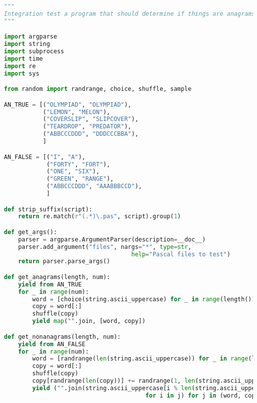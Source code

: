 \documentclass{article}
\begin{document}
\begin{lstlisting}[language=Python, caption=Testing script]
"""
Integration test a program that should determine if things are anagrams
"""

import argparse
import string
import subprocess
import time
import re
import sys

from random import randrange, choice, shuffle, sample

AN_TRUE = [("OLYMPIAD", "OLYMPIAD"),
           ("LEMON", "MELON"),
           ("COVERSLIP", "SLIPCOVER"),
           ("TEARDROP", "PREDATOR"),
           ("ABBCCCDDD", "DDDCCCBBA"),
           ]

AN_FALSE = [("I", "A"),
            ("FORTY", "FORT"),
            ("ONE", "SIX"),
            ("GREEN", "RANGE"),
            ("ABBCCCDDD", "AAABBBCCD"),
            ]

def strip_suffix(script):
    return re.match(r"(.*)\.pas", script).group(1)

def get_args():
    parser = argparse.ArgumentParser(description=__doc__)
    parser.add_argument("files", nargs="*", type=str,
                                    help="Pascal files to test")
    return parser.parse_args()

def get_anagrams(length, num):
    yield from AN_TRUE
    for _ in range(num):
        word = [choice(string.ascii_uppercase) for _ in range(length())]
        copy = word[:]
        shuffle(copy)
        yield map("".join, [word, copy])

def get_nonanagrams(length, num):
    yield from AN_FALSE
    for _ in range(num):
        word = [randrange(len(string.ascii_uppercase)) for _ in range(length())]
        copy = word[:]
        shuffle(copy)
        copy[randrange(len(copy))] += randrange(1, len(string.ascii_uppercase))
        yield ("".join(string.ascii_uppercase[i % len(string.ascii_uppercase)]
                                        for i in j) for j in (word, copy))


\end{lstlisting}
\end{document}
